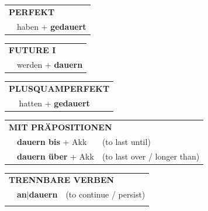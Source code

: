 \documentclass[10pt,a4paper]{revtex4-2}
\begin{document}
\begin{verbbox}
 \begin{tabular}{rl}
     \multicolumn{2}{l}{\textbf{PERFEKT}}\\
   & haben + \textbf{gedauert}\\
  \end{tabular}
\hfill
   \begin{tabular}{rl}
    \multicolumn{2}{l}{\textbf{FUTURE I} }\\
   & werden + \textbf{dauern}\\
  \end{tabular}
\hfill
   \begin{tabular}{rl}
      \multicolumn{2}{l}{\textbf{PLUSQUAMPERFEKT}}\\
   & hatten + \textbf{gedauert}\\
  \end{tabular}

   \vspace{10pt}

   \begin{tabular}{lll}
      \multicolumn{3}{l}{\textbf{MIT PRÄPOSITIONEN}}\\
& \textbf{dauern bis} + Akk & (to last until)\\
& \textbf{dauern über} + Akk & (to last over / longer than)\\
   \end{tabular}
  \hfill
   \begin{tabular}{lll}
      \multicolumn{3}{l}{\textbf{TRENNBARE VERBEN}}\\
 & \textbf{an$|$dauern} & (to continue / persist)\\
\vspace{10pt}
  \end{tabular}

\vspace{-5pt}
\end{verbbox}
\end{document}
